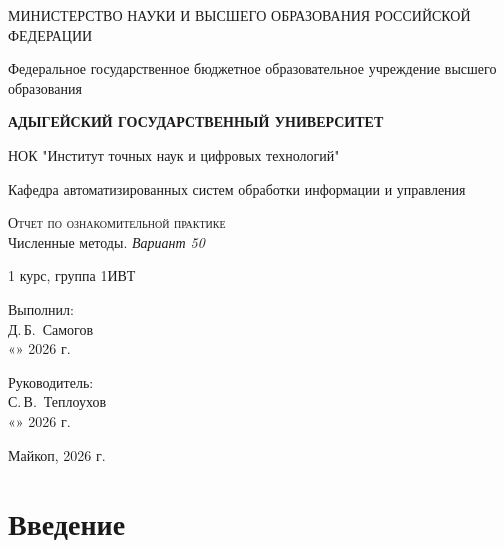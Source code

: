 \documentclass[12pt,a4paper]{scrartcl}
\newlength{\ML}
\begin{document}
\begin{titlepage}
	\begin{center}
		\large
		МИНИСТЕРСТВО НАУКИ И ВЫСШЕГО ОБРАЗОВАНИЯ РОССИЙСКОЙ ФЕДЕРАЦИИ
		
		Федеральное государственное бюджетное образовательное учреждение высшего образования
		
		\textbf{АДЫГЕЙСКИЙ ГОСУДАРСТВЕННЫЙ УНИВЕРСИТЕТ}
		\vspace{0.25cm}
		
		НОК "Институт точных наук и цифровых технологий"
		
		Кафедра автоматизированных систем обработки информации и управления
		\vfill
		\vfill
		
		\textsc{Отчет по ознакомительной практике}\\[5mm]
		
		{\LARGE Численные методы. \textit{Вариант 50}}
		\bigskip
		
		1 курс, группа 1ИВТ
	\end{center}
	\vfill
	
	\hfill\begin{minipage}{0.5\textwidth}
		Выполнил:\\
		\underline{\hspace{\ML}} Д.\,Б.~Самогов\\
		«\underline{\hspace{0.7cm}}» \underline{\hspace{2cm}} 2026 г.
	\end{minipage}%
	\bigskip
	
	\hfill\begin{minipage}{0.5\textwidth}
		Руководитель:\\
		\underline{\hspace{\ML}} С.\,В.~Теплоухов\\
		«\underline{\hspace{0.7cm}}» \underline{\hspace{2cm}} 2026 г.
	\end{minipage}%
	\vfill
	
	\begin{center}
		Майкоп, 2026 г.
	\end{center}
\end{titlepage}

\section{Введение}
\end{document}
